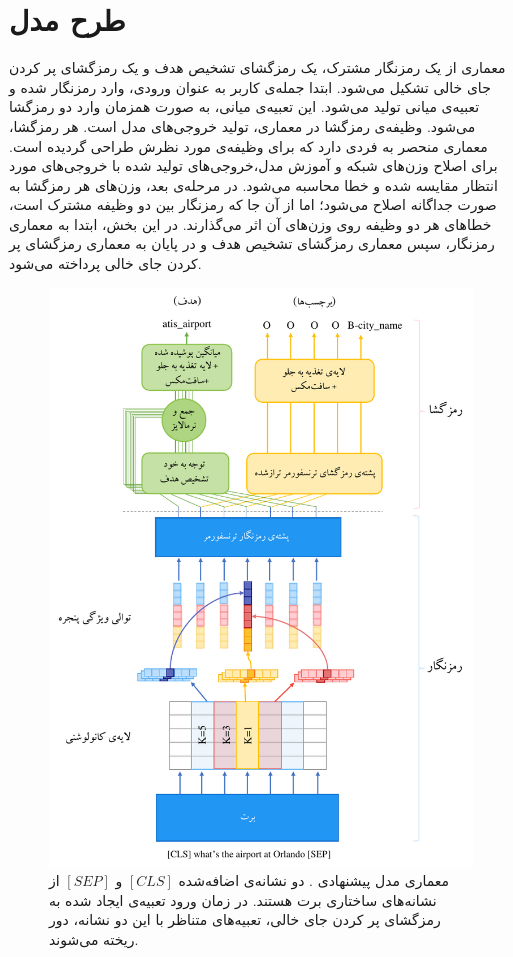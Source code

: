 \section{طرح مدل}
معماری  از یک رمزنگار مشترک، یک رمزگشای تشخیص هدف و یک رمزگشای پر کردن جای خالی تشکیل می‌شود. ابتدا جمله‌ی کاربر به عنوان ورودی، وارد رمزنگار شده و تعبیه‌ی میانی تولید می‌شود. این تعبیه‌ی میانی، به صورت همزمان وارد دو رمزگشا می‌شود. وظیفه‌ی رمزگشا در معماری، تولید خروجی‌های مدل است. هر رمزگشا، معماری منحصر به فردی دارد که برای وظیفه‌ی مورد نظرش طراحی گردیده است. برای اصلاح وزن‌های شبکه و آموزش مدل،خروجی‌های تولید شده با خروجی‌های مورد انتظار مقایسه شده و خطا محاسبه می‌شود. در مرحله‌ی بعد، وزن‌های هر رمزگشا به صورت جداگانه اصلاح می‌شود؛ اما از آن جا که رمزنگار بین دو وظیفه مشترک است، خطاهای هر دو وظیفه روی وزن‌های آن اثر می‌گذارند. در این بخش، ابتدا به معماری رمزنگار، سپس معماری رمزگشای تشخیص هدف و در پایان به معماری رمزگشای پر کردن جای خالی پرداخته می‌شود.
\begin{figure}[!htb]
	\centering
	\includegraphics[scale=1]{Figures/modelarchitecture.pdf}
	\caption[معماری مدل پیشنهادی ]{معماری مدل پیشنهادی . دو نشانه‌ی اضافه‌شده $[CLS]$ و $[SEP]$ از نشانه‌های ساختاری برت هستند. در زمان ورود تعبیه‌ی ایجاد شده به رمزگشای پر کردن جای خالی، تعبیه‌های متناظر با این دو نشانه، دور ریخته می‌شوند.}
	\label{Fig:architecture}
\end{figure}
